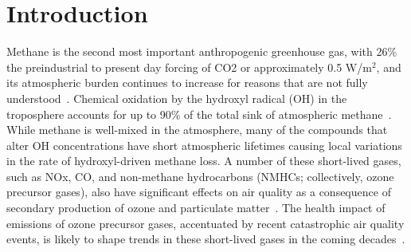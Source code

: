\section{Introduction}



Methane is the second most important anthropogenic greenhouse gas, with 26\% the preindustrial to present day forcing of CO2 or approximately 0.5 W/m$^2$, and its atmospheric burden continues to increase for reasons that are not fully understood~\citep{ref:myhre2013}. Chemical oxidation by the hydroxyl radical (OH) in the troposphere accounts for up to 90\% of the total sink of atmospheric methane~\citep{ref:kirschke2013}. While methane is well-mixed in the atmosphere, many of the compounds that alter OH concentrations have short atmospheric lifetimes causing local variations in the rate of hydroxyl-driven methane loss. A number of these short-lived gases, such as NOx, CO, and non-methane hydrocarbons (NMHCs; collectively, ozone precursor gases), also have significant effects on air quality as a consequence of secondary production of ozone and particulate matter~\citep{ref:driscoll2015}. The health impact of emissions of ozone precursor gases, accentuated by recent catastrophic air quality events, is likely to shape trends in these short-lived gases in the coming decades~\citep{ref:forouzanfar2015}.


